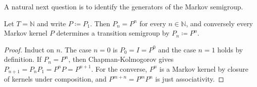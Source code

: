 	A natural next question is to identify the generators of the Markov semigroup.  

	\begin{theorem}
		\label{thm:discrete-time-semigroup-is-generated-by-one-kernel}
		Let $T = \mathbb{N}$ and write $P \coloneqq P_1$. Then $P_n = P^n$ for every $n \in \mathbb{N}$, and conversely every Markov kernel $P$ determines a transition semigroup by $P_n \coloneqq P^n$.
	\end{theorem}
	\begin{proof}
		Induct on $n$. The case $n = 0$ is $P_0 = I = P^0$ and the case $n = 1$ holds by definition. If $P_n = P^n$, then Chapman-Kolmogorov gives $P_{n+1} = P_n P_1 = P^n P = P^{n+1}$. For the converse, $P^n$ is a Markov kernel by closure of kernels under composition, and $P^{m+n} = P^m P^n$ is just associativity.
	\end{proof}

